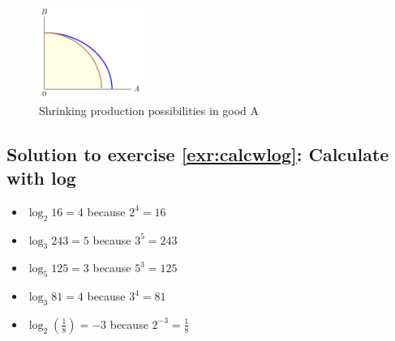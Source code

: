 \documentclass[
  12pt,
  oneside]{book}
\providecommand{\tightlist}{%
  \setlength{\itemsep}{0pt}\setlength{\parskip}{0pt}}
\theoremstyle{definition}
\theoremstyle{definition}
\theoremstyle{definition}
\theoremstyle{definition}
\theoremstyle{remark}
\begin{document}
\begin{figure}
\centering
\includegraphics[width=0.3\textwidth,height=\textheight]{fig/ppf4.png}
\caption{\label{fig:ppf4} Shrinking production possibilities in good A}
\end{figure}

\hypertarget{sol:calcwlog}{%
\subsection*{Solution to exercise \ref{exr:calcwlog}: Calculate with log}\label{sol:calcwlog}}

\begin{itemize}
\tightlist
\item
  \(\log_2 16=4\) because \(2^4=16\)
\item
  \(\log_3 243=5\) because \(3^5=243\)
\item
  \(\log_5 125=3\) because \(5^3=125\)
\item
  \(\log_3 81=4\) because \(3^4=81\)
\item
  \(\log_2 \left(\frac{1}{8}\right)=-3\) because \(2^{-3}=\frac{1}{8}\)
\end{itemize}

  
\end{document}
